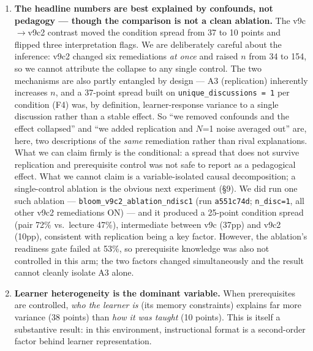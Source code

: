 \documentclass[11pt]{article}
\begin{document}
\begin{enumerate}
    Findings 2--4 are the substance of the negative result: the three structural
    variables Bloom's account rests on --- group size, individual engagement, and
    social interaction itself --- each failed to predict learning in the one
    generation where prerequisites were controlled and discussions were genuinely
    replicated.  We state them separately because they were tested separately, and
    because a null reported only as a flag value is easy to lose.

  \item \textbf{The headline numbers are best explained by confounds, not pedagogy
    --- though the comparison is not a clean ablation.}  The v9c$\to$v9c2 contrast
    moved the condition spread from 37 to 10 points and flipped three interpretation
    flags.  We are deliberately careful about the inference: v9c2 changed six
    remediations \emph{at once} and raised $n$ from 34 to 154, so we cannot attribute
    the collapse to any single control.  The two mechanisms are also partly entangled
    by design --- A3 (replication) inherently increases $n$, and a 37-point spread
    built on \texttt{unique\_discussions = 1} per condition (F4) was, by definition,
    learner-response variance to a single discussion rather than a stable effect.  So
    ``we removed confounds and the effect collapsed'' and ``we added replication and
    $N$=1 noise averaged out'' are, here, two descriptions of the \emph{same}
    remediation rather than rival explanations.  What we can claim firmly is the
    conditional: a spread that does not survive replication and prerequisite control
    was not safe to report as a pedagogical effect.  What we cannot claim is a
    variable-isolated causal decomposition; a single-control ablation is the obvious
    next experiment (\S9).  We did run one such ablation ---
    \texttt{bloom\_v9c2\_ablation\_ndisc1} (run \texttt{a551c74d}; \texttt{n\_disc=1},
    all other v9c2 remediations ON) --- and it produced a 25-point condition spread
    (pair 72\% vs.\ lecture 47\%), intermediate between v9c (37pp) and v9c2 (10pp),
    consistent with replication being a key factor.  However, the ablation's readiness
    gate failed at 53\%, so prerequisite knowledge was also not controlled in this
    arm; the two factors changed simultaneously and the result cannot cleanly isolate
    A3 alone.

  \item \textbf{Learner heterogeneity is the dominant variable.}  When prerequisites
    are controlled, \emph{who the learner is} (its memory constraints) explains far
    more variance (38 points) than \emph{how it was taught} (10 points).  This is
    itself a substantive result: in this environment, instructional format is a
    second-order factor behind learner representation.


\end{enumerate}
\end{document}
